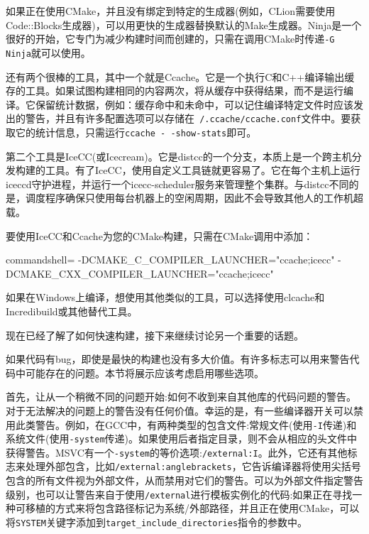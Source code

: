 如果正在使用CMake，并且没有绑定到特定的生成器(例如，CLion需要使用Code::Blocks生成器)，可以用更快的生成器替换默认的Make生成器。Ninja是一个很好的开始，它专门为减少构建时间而创建的，只需在调用CMake时传递\texttt{-G Ninja}就可以使用。

还有两个很棒的工具，其中一个就是Ccache。它是一个执行C和C++编译输出缓存的工具。如果试图构建相同的内容两次，将从缓存中获得结果，而不是运行编译。它保留统计数据，例如：缓存命中和未命中，可以记住编译特定文件时应该发出的警告，并且有许多配置选项可以存储在\texttt{~/.ccache/ccache.conf}文件中。要获取它的统计信息，只需运行\texttt{ccache -\,-show-stats}即可。

第二个工具是IceCC(或Icecream)。它是distcc的一个分支，本质上是一个跨主机分发构建的工具。有了IceCC，使用自定义工具链就更容易了。它在每个主机上运行iceccd守护进程，并运行一个icecc-scheduler服务来管理整个集群。与distcc不同的是，调度程序确保只使用每台机器上的空闲周期，因此不会导致其他人的工作机超载。

要使用IceCC和Ccache为您的CMake构建，只需在CMake调用中添加：

\begin{tcblisting}{commandshell={}}
-DCMAKE_C_COMPILER_LAUNCHER="ccache;icecc"
-DCMAKE_CXX_COMPILER_LAUNCHER="ccache;icecc"
\end{tcblisting}

如果在Windows上编译，想使用其他类似的工具，可以选择使用clcache和Incredibuild或其他替代工具。

现在已经了解了如何快速构建，接下来继续讨论另一个重要的话题。


如果代码有bug，即使是最快的构建也没有多大价值。有许多标志可以用来警告代码中可能存在的问题。本节将展示应该考虑启用哪些选项。

首先，让从一个稍微不同的问题开始:如何不收到来自其他库的代码问题的警告。对于无法解决的问题上的警告没有任何价值。幸运的是，有一些编译器开关可以禁用此类警告。例如，在GCC中，有两种类型的包含文件:常规文件(使用\texttt{-I}传递)和系统文件(使用\texttt{-system}传递)。如果使用后者指定目录，则不会从相应的头文件中获得警告。MSVC有一个\texttt{-system}的等价选项:\texttt{/external:I}。此外，它还有其他标志来处理外部包含，比如\texttt{/external:anglebrackets}，它告诉编译器将使用尖括号包含的所有文件视为外部文件，从而禁用对它们的警告。可以为外部文件指定警告级别，也可以让警告来自于使用\texttt{/external}进行模板实例化的代码:如果正在寻找一种可移植的方式来将包含路径标记为系统/外部路径，并且正在使用CMake，可以将\texttt{SYSTEM}关键字添加到\texttt{target\_include\_directories}指令的参数中。

